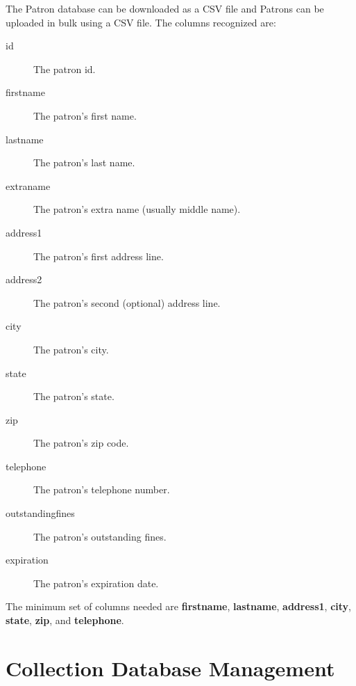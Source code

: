 \documentclass[letterpaper,twoside]{article}
\begin{document}
The Patron database can be downloaded as a CSV file and Patrons can be
uploaded in bulk using a CSV file.  The columns recognized are:
\begin{description}
\item[id] The patron id.
\item[firstname] The patron's first name.
\item[lastname] The patron's last name.
\item[extraname] The patron's extra name (usually middle name).
\item[address1] The patron's first address line.
\item[address2] The patron's second (optional) address line.
\item[city] The patron's city.
\item[state] The patron's state.
\item[zip] The patron's zip code.
\item[telephone] The patron's telephone number.
\item[outstandingfines] The patron's outstanding fines.
\item[expiration] The patron's expiration date.
\end{description}

The minimum set of columns needed are \textbf{firstname},
\textbf{lastname}, \textbf{address1}, \textbf{city}, \textbf{state},
\textbf{zip}, and \textbf{telephone}.

\section{Collection Database Management}
\end{document}
